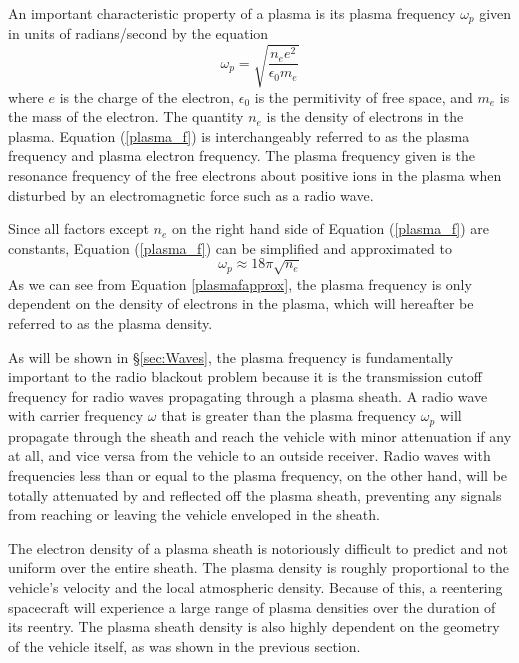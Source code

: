 \documentclass[twocolumn]{article}
\begin{document}
An important characteristic property of a plasma is its plasma frequency $\omega_p$ given in units of radians/second by the equation
\begin{equation} \label{plasma_f}
\omega_p = \sqrt{\frac{n_e e^2}{\epsilon_0 m_e}}
\end{equation}
where $e$ is the charge of the electron, $\epsilon_0$ is the permitivity of free space, and $m_e$ is the mass of the electron. 
The quantity $n_e$ is the density of electrons in the plasma.\cite{chen_introduction_1984,kim_analysis_2008}
Equation (\ref{plasma_f}) is interchangeably referred to as the plasma frequency and plasma electron frequency. The plasma frequency given is the resonance frequency of the free electrons about positive ions in the plasma when disturbed by an electromagnetic force such as a radio wave.\cite{chen_introduction_1984}

Since all factors except $n_e$ on the right hand side of  Equation (\ref{plasma_f}) are constants, Equation (\ref{plasma_f}) can be simplified and approximated to
\begin{equation} \label{plasmafapprox}
\omega_p \approx 18\pi\sqrt{n_e}
\end{equation}
As we can see from Equation \ref{plasmafapprox}, the plasma frequency is only dependent on the density of electrons in the plasma, which will hereafter be referred to as the plasma density.

As will be shown in \S\ref{sec:Waves}, the plasma frequency is fundamentally important to the radio blackout problem because it is the transmission cutoff frequency for radio waves propagating through a plasma sheath.
A radio wave with carrier frequency $\omega$ that is greater than the plasma frequency $\omega_p$ will propagate through the sheath and reach the vehicle with minor attenuation if any at all, and vice versa from the vehicle to an outside receiver.
Radio waves with frequencies less than or equal to the plasma frequency, on the other hand, will be totally attenuated by and reflected off the plasma sheath, preventing any signals from reaching or leaving the vehicle enveloped in the sheath.

The electron density of a plasma sheath is notoriously difficult to predict and not uniform over the entire sheath.
The plasma density is roughly proportional to the vehicle's velocity and the local atmospheric density.
Because of this, a reentering spacecraft will experience a large range of plasma densities over the duration of its reentry.
The plasma sheath density is also highly dependent on the geometry of the vehicle itself, as was shown in the previous section.
\end{document}
